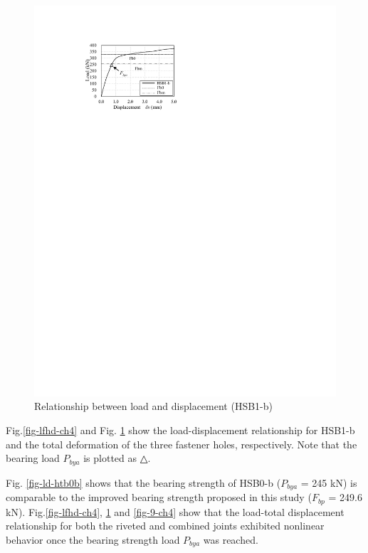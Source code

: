 \begin{figure}[htbp]
\begin{minipage}[t]{0.48\textwidth}
    \includegraphics{imgs/ch4/ld-htb1b.pdf}
    \caption{Relationship between load and displacement (HSB1-b)}
    \label{fig-8ch4}
    \end{minipage}

\end{figure}

Fig.\ref{fig-lfhd-ch4} and Fig. \ref{fig-8ch4} show the load-displacement relationship for HSB1-b and the total deformation of the three fastener holes, respectively. Note that the bearing load $P_{bya}$ is plotted as △.

Fig. \ref{fig-ld-htb0b} shows that the bearing strength of HSB0-b ($P_{bya}$ = 245 kN) is comparable to the improved bearing strength proposed in this study ($F_{bp}$ = 249.6 kN). Fig.\ref{fig-lfhd-ch4}, \ref{fig-8ch4} and \ref{fig-9-ch4} show that the load-total displacement relationship for both the riveted and combined joints exhibited nonlinear behavior once the bearing strength load $P_{bya}$ was reached.

